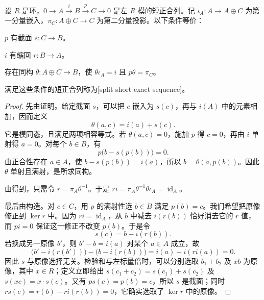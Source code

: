 \begin{theorem}[短正合列的分裂]\label{b2:thm:split-exact-sequence}
	设 \(R\) 是环，\(0\to A\xrightarrow{i}B\xrightarrow{p}C\to0\) 是左 \(R\) 模的短正合列。记 \(\iota_A:A\to A\oplus C\) 为第一分量嵌入，\(\pi_C:A\oplus C\to C\) 为第二分量投影。以下条件等价：
	\begin{equivalences}
		\item\label{b2:item:split-section} \(p\) 有截面 \(s:C\to B\)。
		\item\label{b2:item:split-retraction} \(i\) 有缩回 \(r:B\to A\)。
		\item\label{b2:item:split-compatible-sum} 存在同构 \(\theta:A\oplus C\to B\)，使 \(\theta\iota_A=i\) 且 \(p\theta=\pi_C\)。
	\end{equivalences}
	满足这些条件的短正合列称为[split short exact sequence]。
\end{theorem}

\begin{proof}
	先由证明。给定截面 \(s\)，可以把 \(c\) 嵌入为 \(s(c)\)，再与 \(i(A)\) 中的元素相加，因而定义
	\[
		\theta(a,c)=i(a)+s(c).
	\]
	它是模同态，且满足两项相容等式。若 \(\theta(a,c)=0\)，施加 \(p\) 得 \(c=0\)，再由 \(i\) 单射得 \(a=0\)。对每个 \(b\in B\)，有
	\[
		p\bigl(b-s(p(b))\bigr)=0.
	\]
	由正合性存在 \(a\in A\)，使 \(b-s(p(b))=i(a)\)，所以 \(b=\theta(a,p(b))\)。因此 \(\theta\) 单射且满射，是所求同构。

	由得到，只需令 \(r=\pi_A\theta^{-1}\)。于是 \(ri=\pi_A\theta^{-1}\theta\iota_A=\operatorname{id}_A\)。

	最后由构造。对 \(c\in C\)，用 \(p\) 的满射性选 \(b\in B\) 满足 \(p(b)=c\)。我们希望把原像修正到 \(\ker r\) 中。因为 \(ri=\operatorname{id}_A\)，从 \(b\) 中减去 \(i(r(b))\) 恰好消去它的 \(r\) 值，而 \(pi=0\) 保证这一修正不改变 \(p(b)\)。于是令
	\[
		s(c)=b-i(r(b)).
	\]
	若换成另一原像 \(b'\)，则 \(b'-b=i(a)\) 对某个 \(a\in A\) 成立，故
	\[
		\bigl(b'-i(r(b'))\bigr)-\bigl(b-i(r(b))\bigr) =i(a)-i(ri(a))=0.
	\]
	因此 \(s\) 与原像选择无关。检验和与左标量倍时，可以分别选取 \(b_1+b_2\) 及 \(xb\) 为原像，其中 \(x\in R\)；定义立即给出 \(s(c_1+c_2)=s(c_1)+s(c_2)\) 及 \(s(xc)=x\cdot s(c)\)。又有 \(ps(c)=p(b)=c\)，所以 \(s\) 是截面；同时 \(rs(c)=r(b)-ri(r(b))=0\)，它确实选取了 \(\ker r\) 中的原像。
\end{proof}

